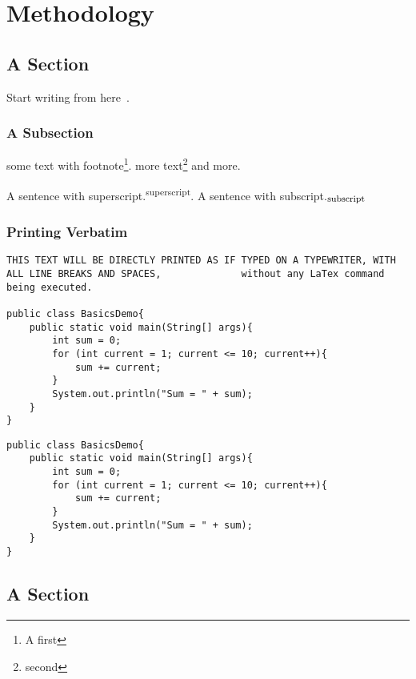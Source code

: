\chapter{Methodology}
\section{A Section}
Start writing from here~\cite{ConcreteMath}.

\subsection{A Subsection}
some text with footnote\footnote{A first}. more
text\footnote{second} and more.

A sentence with superscript.\textsuperscript{superscript}. A
sentence with subscript.$_{\mbox{\footnotesize{subscript}}}$

\subsection{Printing Verbatim}
\begin{verbatim}
THIS TEXT WILL BE DIRECTLY PRINTED AS IF TYPED ON A TYPEWRITER, WITH
ALL LINE BREAKS AND SPACES,              without any LaTex command
being executed.

public class BasicsDemo{
    public static void main(String[] args){
        int sum = 0;
        for (int current = 1; current <= 10; current++){
            sum += current;
        }
        System.out.println("Sum = " + sum);
    }
}
\end{verbatim}

\begin{Verbatim}[frame=single, xrightmargin=2pc]
public class BasicsDemo{
    public static void main(String[] args){
        int sum = 0;
        for (int current = 1; current <= 10; current++){
            sum += current;
        }
        System.out.println("Sum = " + sum);
    }
}
\end{Verbatim}

\section{A Section}
